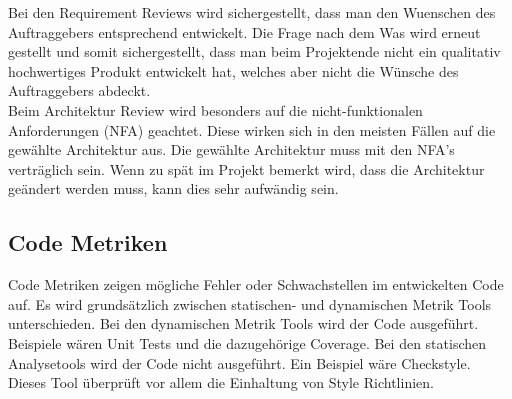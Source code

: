 \noindent Bei den Requirement Reviews wird sichergestellt, dass man den Wuenschen des Auftraggebers entsprechend entwickelt. Die Frage nach dem \glqq Was\grqq{} wird erneut gestellt und somit sichergestellt, dass man beim Projektende nicht ein qualitativ hochwertiges Produkt entwickelt hat, welches aber nicht die Wünsche des Auftraggebers abdeckt.\\ 

\noindent Beim Architektur Review wird besonders auf die nicht-funktionalen Anforderungen (NFA) geachtet. Diese wirken sich in den meisten Fällen auf die gewählte Architektur aus. Die gewählte Architektur muss mit den NFA's verträglich sein. Wenn zu spät im Projekt bemerkt wird, dass die Architektur geändert werden muss, kann dies sehr aufwändig sein.
\subsection{Code Metriken}
Code Metriken zeigen mögliche Fehler oder Schwachstellen im entwickelten Code auf. Es wird grundsätzlich zwischen statischen- und dynamischen Metrik Tools unterschieden. Bei den dynamischen Metrik Tools wird der Code ausgeführt. Beispiele wären Unit Tests und die dazugehörige Coverage. Bei den statischen Analysetools wird der Code nicht ausgeführt. Ein Beispiel wäre Checkstyle. Dieses Tool überprüft vor allem die Einhaltung von Style Richtlinien.\\